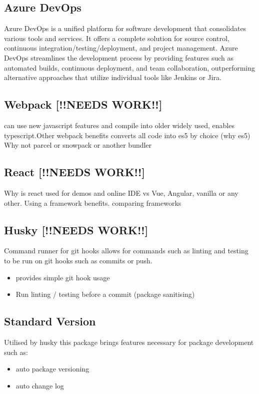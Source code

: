 \documentclass{l4proj}
\begin{document}
\subsection{Azure DevOps}
\text Azure DevOps is a unified platform for software development that consolidates various tools and services. It offers a complete solution for source control, continuous integration/testing/deployment, and project management. Azure DevOps streamlines the development process by providing features such as automated builds, continuous deployment, and team collaboration, outperforming alternative approaches that utilize individual tools like Jenkins or Jira.

\subsection{Webpack [!!NEEDS WORK!!]}
\text can use new javascript features and compile into older widely used, enables typescript.Other webpack benefits converts all code into es5 by choice (why es5)
Why not parcel or snowpack or another bundler

\subsection{React [!!NEEDS WORK!!]}
\text Why is react used for demos and online IDE vs Vue, Angular, vanilla or any other. Using a framework benefits.
comparing frameworks

\subsection{Husky [!!NEEDS WORK!!]}
Command runner for git hooks allows for commands such as linting and testing to be run on git hooks such as commits or push.
\begin{itemize}
    \item provides simple git hook usage
    \item Run linting / testing before a commit (package sanitising)
\end{itemize}
\subsection{Standard Version}
Utilised by husky this package brings features necessary for package development such as:
\begin{itemize}
    \item auto package versioning
    \item auto change log
\end{itemize}
\end{document}
